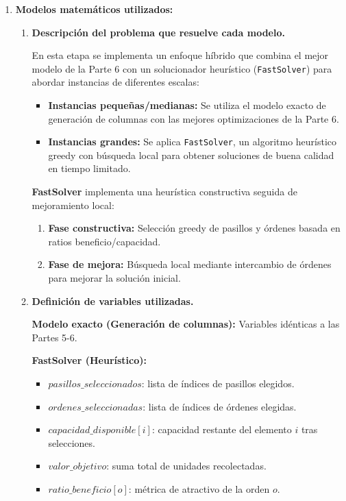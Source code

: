 \documentclass[a4paper,12pt]{article}
\begin{document}
\begin{enumerate}[label=(\alph*), leftmargin=2em]
    \item \textbf{Modelos matemáticos utilizados:}
    \begin{enumerate}[label=\roman*., leftmargin=0.2em]
    
        \item \textbf{Descripción del problema que resuelve cada modelo.}
        
        En esta etapa se implementa un enfoque híbrido que combina el mejor modelo de la Parte 6 con un solucionador heurístico (\texttt{FastSolver}) para abordar instancias de diferentes escalas:

        \begin{itemize}
            \item \textbf{Instancias pequeñas/medianas:} Se utiliza el modelo exacto de generación de columnas con las mejores optimizaciones de la Parte 6.
            \item \textbf{Instancias grandes:} Se aplica \texttt{FastSolver}, un algoritmo heurístico greedy con búsqueda local para obtener soluciones de buena calidad en tiempo limitado.
        \end{itemize}

        \textbf{FastSolver} implementa una heurística constructiva seguida de mejoramiento local:
        \begin{enumerate}
            \item \textbf{Fase constructiva:} Selección greedy de pasillos y órdenes basada en ratios beneficio/capacidad.
            \item \textbf{Fase de mejora:} Búsqueda local mediante intercambio de órdenes para mejorar la solución inicial.
        \end{enumerate}

        \item \textbf{Definición de variables utilizadas.}

        \textbf{Modelo exacto (Generación de columnas):}
        Variables idénticas a las Partes 5-6.

        \textbf{FastSolver (Heurístico):}
        \begin{itemize}
            \item $pasillos\_seleccionados$: lista de índices de pasillos elegidos.
            \item $ordenes\_seleccionadas$: lista de índices de órdenes elegidas.
            \item $capacidad\_disponible[i]$: capacidad restante del elemento $i$ tras selecciones.
            \item $valor\_objetivo$: suma total de unidades recolectadas.
            \item $ratio\_beneficio[o]$: métrica de atractivo de la orden $o$.
        \end{itemize}


\end{enumerate}
\end{enumerate}
\end{document}
